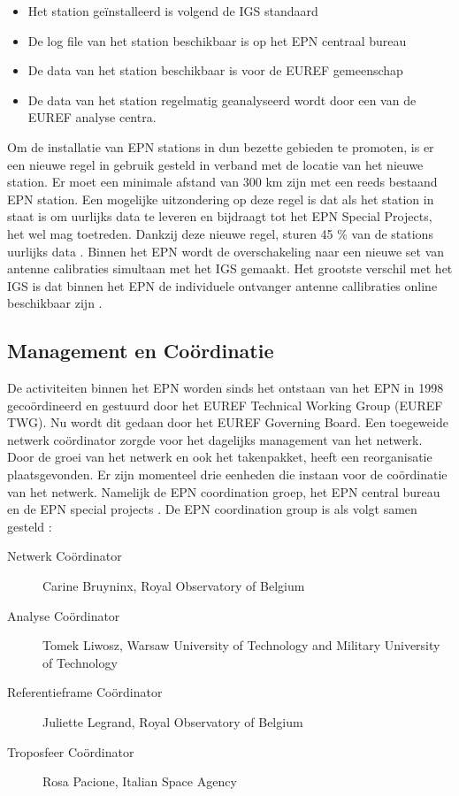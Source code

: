 \begin{itemize}
	\item Het station ge\"installeerd is volgend de IGS standaard
	\item De log file van het station beschikbaar is op het EPN centraal bureau
	\item De data van het station beschikbaar is voor de EUREF gemeenschap
	\item De data van het station regelmatig geanalyseerd wordt door een van de EUREF analyse centra. 
\end{itemize} 
Om de installatie van EPN stations in dun bezette gebieden te promoten, is er een nieuwe regel in gebruik gesteld in verband met de locatie van het nieuwe station. Er moet een minimale afstand van 300 km zijn met een reeds bestaand EPN station. Een mogelijke uitzondering op deze regel is dat als het station in staat is om uurlijks data te leveren en bijdraagt tot het EPN Special Projects, het wel mag toetreden. Dankzij deze nieuwe regel, sturen 45 \% van de stations uurlijks data \cite{LBibEPN6}. Binnen het EPN wordt de overschakeling naar een nieuwe set van antenne calibraties simultaan met het IGS gemaakt. Het grootste verschil met het IGS is dat binnen het EPN de individuele ontvanger antenne callibraties online beschikbaar zijn \cite{LBibEPN4}.

\subsection{Management en Co\"ordinatie}
De activiteiten binnen het EPN worden sinds het ontstaan van het EPN in 1998 geco\"ordineerd en gestuurd door het EUREF Technical Working Group (EUREF TWG). Nu wordt dit gedaan door het EUREF Governing Board.  Een toegeweide netwerk co\"ordinator zorgde voor het dagelijks management van het netwerk. Door de groei van het netwerk en ook het takenpakket, heeft  een reorganisatie plaatsgevonden. Er zijn momenteel drie eenheden die instaan voor de co\"ordinatie van het netwerk. Namelijk de EPN coordination groep, het EPN central bureau en de EPN special projects \cite{LBibEPN6}. 
De EPN coordination group is als volgt samen gesteld \cite{LBibEPN8}:
\begin{description}
	\item[Netwerk Co\"ordinator] Carine Bruyninx, Royal Observatory of Belgium
	\item[Analyse Co\"ordinator] Tomek Liwosz, Warsaw University of Technology and Military University of Technology
	\item[Referentieframe Co\"ordinator] Juliette Legrand, Royal Observatory of Belgium
	\item[Troposfeer Co\"ordinator] Rosa Pacione, Italian Space Agency
\end{description}

